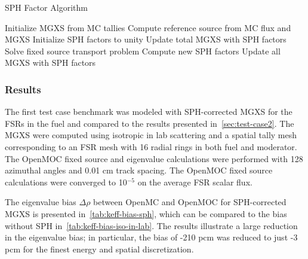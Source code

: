 \begin{algorithm}[h]
\caption{SPH Factor Algorithm}
\label{alg:sph}
\begin{algorithmic}[1]
  \State Initialize MGXS from MC tallies
  \State Compute reference source from MC flux and MGXS
  \State Initialize SPH factors to unity
    \State Update total MGXS with SPH factors
    \State Solve fixed source transport problem\footnotemark
    \State Compute new SPH factors
  \EndWhile
  \State Update all MGXS with SPH factors
\end{algorithmic}
\end{algorithm}



\subsubsection{Results}
\label{subsubsec:sph-results}

The first test case benchmark was modeled with SPH-corrected MGXS for the FSRs in the fuel and compared to the results presented in~\autoref{sec:test-case2}. The MGXS were computed using isotropic in lab scattering and a spatial tally mesh corresponding to an FSR mesh with 16 radial rings in both fuel and moderator. The OpenMOC fixed source and eigenvalue calculations were performed with 128 azimuthal angles and 0.01 cm track spacing. The OpenMOC fixed source calculations were converged to 10$^{-5}$ on the average FSR scalar flux.

The eigenvalue bias $\Delta\rho$ between OpenMC and OpenMOC for SPH-corrected MGXS is presented in~\autoref{tab:keff-bias-sph}, which can be compared to the bias without SPH in~\autoref{tab:keff-bias-iso-in-lab}. The results illustrate a large reduction in the eigenvalue bias; in particular, the bias of -210 pcm was reduced to just -3 pcm for the finest energy and spatial discretization.

